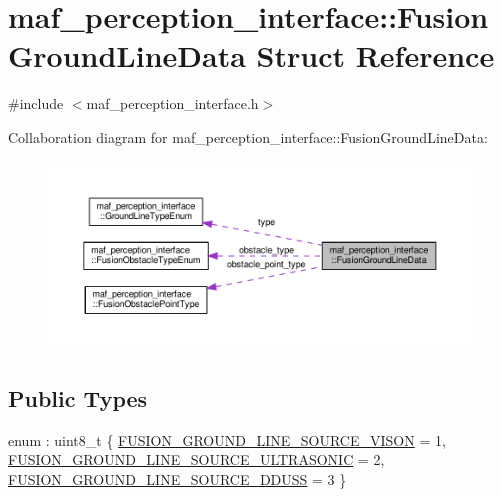 \hypertarget{structmaf__perception__interface_1_1FusionGroundLineData}{}\section{maf\+\_\+perception\+\_\+interface\+:\+:Fusion\+Ground\+Line\+Data Struct Reference}
\label{structmaf__perception__interface_1_1FusionGroundLineData}


{\ttfamily \#include $<$maf\+\_\+perception\+\_\+interface.\+h$>$}



Collaboration diagram for maf\+\_\+perception\+\_\+interface\+:\+:Fusion\+Ground\+Line\+Data\+:\nopagebreak
\begin{figure}[H]
\begin{center}
\leavevmode
\includegraphics[width=350pt]{structmaf__perception__interface_1_1FusionGroundLineData__coll__graph}
\end{center}
\end{figure}
\subsection*{Public Types}
\begin{DoxyCompactItemize}
\item 
enum \+: uint8\+\_\+t \{ \hyperlink{structmaf__perception__interface_1_1FusionGroundLineData_abf1a65db0d80106061899593cef55f6ca38f26e6663446eb8fe2140268ece244a}{F\+U\+S\+I\+O\+N\+\_\+\+G\+R\+O\+U\+N\+D\+\_\+\+L\+I\+N\+E\+\_\+\+S\+O\+U\+R\+C\+E\+\_\+\+V\+I\+S\+ON} = 1, 
\hyperlink{structmaf__perception__interface_1_1FusionGroundLineData_abf1a65db0d80106061899593cef55f6cadd413339dc1378ad6e14b46cbbc1c963}{F\+U\+S\+I\+O\+N\+\_\+\+G\+R\+O\+U\+N\+D\+\_\+\+L\+I\+N\+E\+\_\+\+S\+O\+U\+R\+C\+E\+\_\+\+U\+L\+T\+R\+A\+S\+O\+N\+IC} = 2, 
\hyperlink{structmaf__perception__interface_1_1FusionGroundLineData_abf1a65db0d80106061899593cef55f6ca820c7f9632817fa59aeac971399bf7ad}{F\+U\+S\+I\+O\+N\+\_\+\+G\+R\+O\+U\+N\+D\+\_\+\+L\+I\+N\+E\+\_\+\+S\+O\+U\+R\+C\+E\+\_\+\+D\+D\+U\+SS} = 3
 \}
\end{DoxyCompactItemize}
